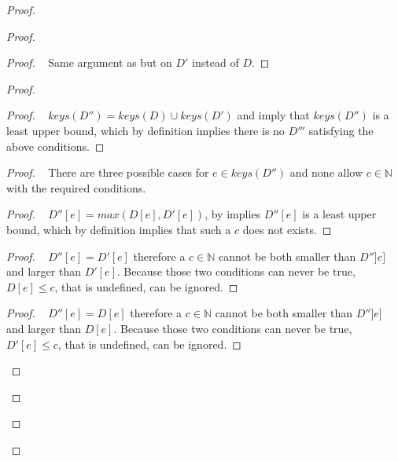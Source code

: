 \documentclass[11pt, oneside]{article}   	%
\begin{document}
\begin{proof}
\begin{proof}
		\begin{proof}
			\pf~ Same argument as  but on $D'$ instead of $D$.
		\end{proof}
		
		\begin{proof}
			\begin{proof}
				\pf~ $\textit{keys}(D'') = \textit{keys}(D) \cup \textit{keys}(D')$ and  imply that $\textit{keys}(D'')$ is a least upper bound, which by definition implies there is no $D'''$ satisfying the above conditions.
			\end{proof}
			
			\begin{proof}
				\pfsketch~ There are three possible cases for $e \in \textit{keys}(D'')$ and none allow $c \in \mathds{N}$ with the required conditions.
				\begin{proof}
					\pf~ $D''[e] = \textit{max}(D[e], D'[e])$, by  implies $D''[e]$ is a least upper bound, which by definition implies that such a $c$ does not exists.
				\end{proof}
				
				\begin{proof}
					\pf~ $D''[e] = D'[e]$ therefore a $c \in \mathds{N}$ cannot be both smaller than $D'']e]$ and larger than $D'[e]$. Because those two conditions can never be true, $D[e] \leq c$, that is undefined, can be ignored.
				\end{proof}
				
				\begin{proof}
					\pf~ $D''[e] = D[e]$ therefore a $c \in \mathds{N}$ cannot be both smaller than $D'']e]$ and larger than $D[e]$. Because those two conditions can never be true,  $D'[e] \leq c$, that is undefined, can be ignored.


\end{proof}
\end{proof}
\end{proof}
\end{proof}
\end{proof}
\end{document}
